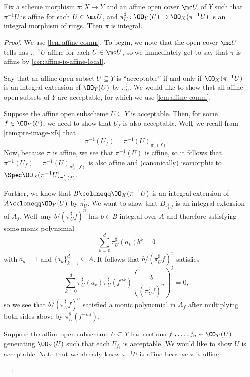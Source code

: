 \documentclass[../notes.tex]{subfiles}
\begin{document}
\begin{lemma} \label{lem:almost-integral-affine-local-target}
	Fix a scheme morphism $\pi\colon X\to Y$ and an affine open cover $\mc U$ of $Y$ such that $\pi^{-1}U$ is affine for each $U\in\mc U$, and $\pi^\sharp_U\colon\OO_Y(U)\to\OO_X(\pi^{-1}U)$ is an integral morphism of rings. Then $\pi$ is integral.
\end{lemma}
\begin{proof}
	We use \autoref{lem:affine-comm}. To begin, we note that the open cover $\mc U$ tells has $\pi^{-1}U$ affine for each $U\in\mc U$, so we immediately get to say that $\pi$ is affine by \autoref{cor:affine-is-affine-local}.
	
	Say that an affine open subset $U\subseteq Y$ is ``acceptable'' if and only if $\OO_X(\pi^{-1}U)$ is an integral extension of $\OO_Y(U)$ by $\pi^\sharp_U$. We would like to show that all affine open subsets of $Y$ are acceptable, for which we use \autoref{lem:affine-comm}.
	\begin{listroman}
		\item Suppose the affine open subscheme $U\subseteq Y$ is acceptable. Then, for some $f\in\OO_Y(U)$, we need to show that $U_f$ is also acceptable. Well, we recall from \autoref{rem:pre-image-xfs} that
		\[\pi^{-1}(U_f)=\pi^{-1}(U)_{\pi^\sharp_U(f)}.\]
		Now, because $\pi$ is affine, we see that $\pi^{-1}(U)$ is affine, so it follows that $\pi^{-1}(U_f)=\pi^{-1}(U)_{\pi^\sharp_U(f)}$ is also affine and (canonically) isomorphic to $\Spec\OO_X(\pi^{-1}U)_{\pi^\sharp_U(f)}$.
		
		Further, we know that $B\coloneqq\OO_X(\pi^{-1}U)$ is an integral extension of $A\coloneqq\OO_Y(U)$ by $\pi^\sharp_U$. We want to show that $B_{\pi^\sharp_Uf}$ is an integral extension of $A_f$. Well, any $b/(\pi^\sharp_Uf)^n$ has $b\in B$ integral over $A$ and therefore satisfying some monic polynomial
		\[\sum_{k=0}^d\pi^\sharp_U(a_k)b^k=0\]
		with $a_d=1$ and $\{a_k\}_{k=1}^d\subseteq A$. It follows that $b/(\pi^\sharp_Uf)^n$ satisfies
		\[\sum_{k=0}^d\pi^\sharp_U(a_k)\pi^\sharp_U(f^{nk})\left(\frac b{(\pi^\sharp_Uf)^n}\right)^k=0,\]
		so we see that $b/(\pi^\sharp_Uf)^n$ satisfied a monic polynomial in $A_f$ after multiplying both sides above by $\pi^\sharp_U(f^{-nd})$.
		\item Suppose the affine open subscheme $U\subseteq Y$ has sections $f_1,\ldots,f_n\in\OO_Y(U)$ generating $\OO_Y(U)$ such that each $U_{f_i}$ is acceptable. We would like to show $U$ is acceptable. Note that we already know $\pi^{-1}U$ is affine because $\pi$ is affine.


\end{listroman}
\end{proof}
\end{document}

